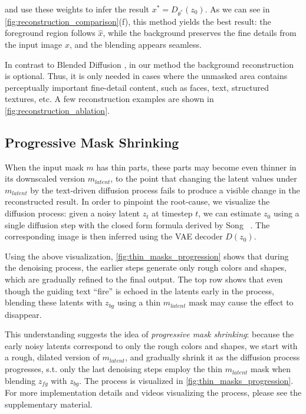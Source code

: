 and use these weights to infer the result $x^*=D_{\theta^*}(z_0)$. As we can see in \ref{fig:reconstruction_comparison}(f), this method yields the best result: the foreground region follows $\hat{x}$, while the background preserves the fine details from the input image $x$, and the blending appears seamless.

In contrast to Blended Diffusion \cite{avrahami2022blended}, in our method the background reconstruction is optional. Thus, it is only needed in cases where the unmasked area contains perceptually important fine-detail content, such as faces, text, structured textures, etc. A few reconstruction examples are shown in \ref{fig:reconstruction_ablation}.

\subsection{Progressive Mask Shrinking}
\label{sec:handling_thin_masks}

When the input mask $m$ has thin parts, these parts may become even thinner in its downscaled version $m_{\textit{latent}}$, to the point that changing the latent values under $m_{\textit{latent}}$ by the text-driven diffusion process fails to produce a visible change in the reconstructed result. In order to pinpoint the root-cause, we visualize the diffusion process: given a noisy latent $z_t$ at timestep $t$, we can estimate $z_0$ using a single diffusion step with the closed form formula derived by Song \etal~.
The corresponding image is then inferred using the VAE decoder $D(z_0)$.

Using the above visualization, \ref{fig:thin_masks_progression} shows that during the denoising process, the earlier steps generate only rough colors and shapes, which are gradually refined to the final output. The top row shows that even though the guiding text ``fire'' is echoed in the latents early in the process, blending these latents with $z_{\textit{bg}}$ using a thin $m_{\textit{latent}}$ mask may cause the effect to disappear.

This understanding suggests the idea of \emph{progressive mask shrinking}: because the early noisy latents correspond to only the rough colors and shapes, we start with a rough, dilated version of $m_{\textit{latent}}$, and gradually shrink it as the diffusion process progresses, s.t. only the last denoising steps employ the thin $m_{\textit{latent}}$ mask when blending $z_{\textit{fg}}$ with $z_{\textit{bg}}$. The process is visualized in \ref{fig:thin_masks_progression}.
For more implementation details and videos visualizing the process, please see the supplementary material. 

